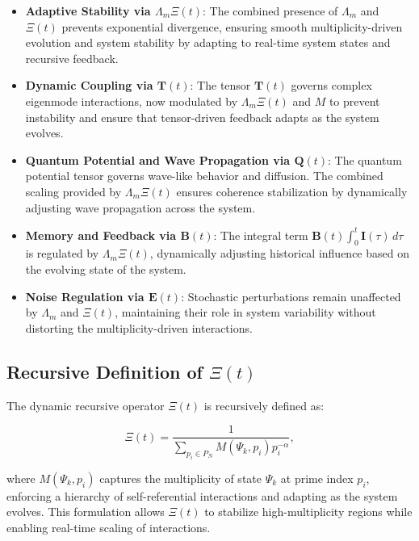 \documentclass[12pt]{article}
\theoremstyle{plain}
\begin{document}
\begin{itemize}
    \item \textbf{Adaptive Stability via \(\Lambda_m \Xi(t)\)}: The combined presence of \(\Lambda_m\) and \(\Xi(t)\) prevents exponential divergence, ensuring smooth multiplicity-driven evolution and system stability by adapting to real-time system states and recursive feedback.
    \item \textbf{Dynamic Coupling via \( \bm{T}(t) \)}: The tensor \( \bm{T}(t) \) governs complex eigenmode interactions, now modulated by \(\Lambda_m \Xi(t)\) and \(M\) to prevent instability and ensure that tensor-driven feedback adapts as the system evolves.
    \item \textbf{Quantum Potential and Wave Propagation via \( \bm{Q}(t) \)}: The quantum potential tensor governs wave-like behavior and diffusion. The combined scaling provided by \(\Lambda_m \Xi(t)\) ensures coherence stabilization by dynamically adjusting wave propagation across the system.
    \item \textbf{Memory and Feedback via \( \bm{B}(t) \)}: The integral term \( \bm{B}(t) \int_0^t \bm{I}(\tau) \, d\tau \) is regulated by \(\Lambda_m \Xi(t)\), dynamically adjusting historical influence based on the evolving state of the system.
    \item \textbf{Noise Regulation via \( \bm{E}(t) \)}: Stochastic perturbations remain unaffected by \(\Lambda_m\) and \(\Xi(t)\), maintaining their role in system variability without distorting the multiplicity-driven interactions.
\end{itemize}


\subsection{Recursive Definition of \(\Xi(t)\)}


The dynamic recursive operator \(\Xi(t)\) is recursively defined as:


\begin{equation}
\Xi(t) = \frac{1}{\sum_{p_i \in P_N} M(\Psi_k, p_i) p_i^{-\alpha}},
\end{equation}


where \( M(\Psi_k, p_i) \) captures the multiplicity of state \( \Psi_k \) at prime index \( p_i \), enforcing a hierarchy of self-referential interactions and adapting as the system evolves. This formulation allows \(\Xi(t)\) to stabilize high-multiplicity regions while enabling real-time scaling of interactions.
\end{document}
